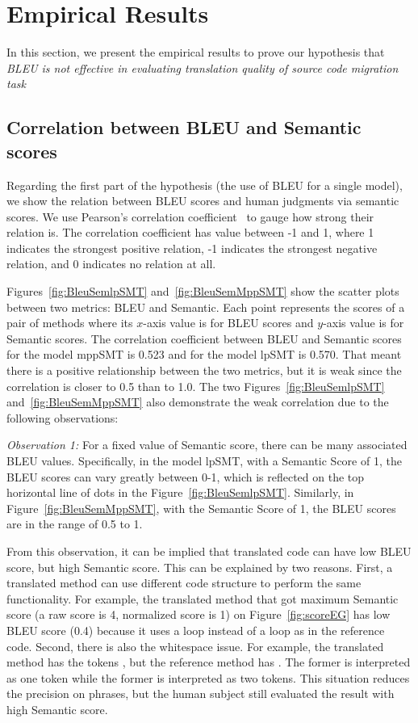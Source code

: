 \section{Empirical Results}
\label{sec:bleuresult}

In this section, we present the empirical results to prove our hypothesis that \textit{BLEU is not effective in evaluating translation quality of source code migration task}
\subsection{Correlation between BLEU and Semantic scores}
Regarding the first part of the hypothesis (the use of BLEU for a single model), we show the relation
between BLEU scores and human judgments via semantic scores. We use
Pearson's correlation coefficient~\cite{PearsonCorrelation} to gauge
how strong their relation is. The correlation coefficient has value
between -1 and 1, where 1 indicates the strongest positive relation, -1
indicates the strongest negative relation, and 0 indicates no relation at
all.

Figures~\ref{fig:BleuSemlpSMT} and~\ref{fig:BleuSemMppSMT} show the
scatter plots between two metrics: BLEU and Semantic. Each point
represents the scores of a pair of methods where its $x$-axis value is
for BLEU scores and $y$-axis value is for Semantic scores. The
correlation coefficient between BLEU and Semantic scores for the model
mppSMT is 0.523 and for the model lpSMT is 0.570. That meant there is a
positive relationship between the two metrics, but it is weak
since the correlation is closer to 0.5 than to 1.0. The two
Figures~\ref{fig:BleuSemlpSMT} and~\ref{fig:BleuSemMppSMT} also
demonstrate the weak correlation due to the following observations:

\emph{Observation 1:} For a fixed value of Semantic score, there can
be many associated BLEU values. Specifically, in the model lpSMT, with
a Semantic Score of 1, the BLEU scores can vary greatly between 0-1,
which is reflected on the top horizontal line of dots in the
Figure~\ref{fig:BleuSemlpSMT}. Similarly, in
Figure~\ref{fig:BleuSemMppSMT}, with the Semantic Score of 1, the BLEU
scores are in the range of 0.5 to 1.

From this observation, it can be implied that translated code can have
low BLEU score, but high Semantic score. This can be explained by two
reasons. First, a translated method can use different code structure
to perform the same functionality. For example, the translated method
that got maximum Semantic score (a raw score is 4, normalized score is
1) on Figure~\ref{fig:scoreEG} has low BLEU score (0.4) because it
uses a  loop instead of a  loop as in the
reference code. Second, there is also the whitespace issue. For
example, the translated method has the tokens , but the
reference method has . The former is interpreted as one
token while the former is interpreted as two tokens. This situation
reduces the precision on phrases, but the human subject still
evaluated the result with high Semantic score.

